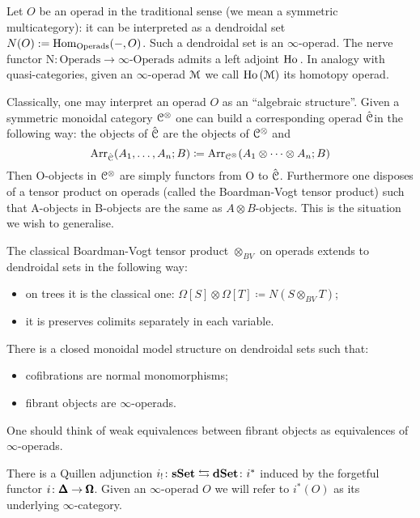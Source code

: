 \begin{refsection}
\begin{remark}
Let $O$ be an operad in the traditional sense (we mean a symmetric multicategory): it can be interpreted as a dendroidal set $N(O):= \mathrm{Hom}_{\mathrm{Operads}}(-,O)$. Such a dendroidal set is an $\infty$-operad. The nerve functor $\mathrm{N} \colon \mathrm{Operads} \to \infty \textrm{-} \mathrm{Operads}$ admits a left adjoint $\operatorname{\mathrm{Ho} \,}$. In analogy with quasi-categories, given an $\infty$-operad $\mathcal{M}$ we call $\operatorname{\mathrm{Ho} \,}(\mathcal{M})$ its homotopy operad.
\end{remark}

Classically, one may interpret an operad $O$ as an ``algebraic structure''. Given a symmetric monoidal category $\mathcal{C}^{\otimes}$ one can build a corresponding operad $\hat{\mathcal{C}}$in the
following way: the objects of $\hat{\mathcal{C}}$ are the objects of $\mathcal{C}^{\otimes}$ and
\[
\mathrm{Arr}_{\hat{\mathcal{C}}}(A_1,\dots,A_n;B) \coloneqq \mathrm{Arr}_{\mathcal{C}^{\otimes}}(A_1\otimes\dots\otimes A_n;B)
\]
Then O-objects in $\mathcal{C}^{\otimes}$ are simply functors from O to $\hat{\mathcal{C}}$. Furthermore one disposes of a tensor product on operads (called the Boardman-Vogt tensor product)
such that A-objects in B-objects are the same as $A\otimes B$-objects. This is the situation we wish to generalise.

The classical Boardman-Vogt tensor product $\otimes_{BV}$ on operads extends to dendroidal sets in the following way:
\begin{itemize}
\item on trees it is the classical one: $\Omega[S]\otimes\Omega[T] \coloneqq N(S\otimes_{BV}T)$;
\item it is preserves colimits separately in each variable.
\end{itemize}

\begin{proposition}[\cite{Mo-We}]
There is a closed monoidal model structure on dendroidal sets such that:
\begin{itemize}
\item cofibrations are normal monomorphisms;
\item fibrant objects are $\infty$-operads.
\end{itemize}
One should think of weak equivalences between fibrant objects as equivalences of $\infty$-operads.
\end{proposition}

\begin{remark}
There is a Quillen adjunction $i_! \colon \mathbf{sSet} \leftrightarrows \mathbf{dSet} \colon i^*$ induced by the forgetful functor $i \colon \pmb{\Delta} \to \pmb{\Omega}$. Given an $\infty$-operad $O$ we will refer
to $i^*(O)$ as its underlying $\infty$-category.
\end{remark}


\end{refsection}
